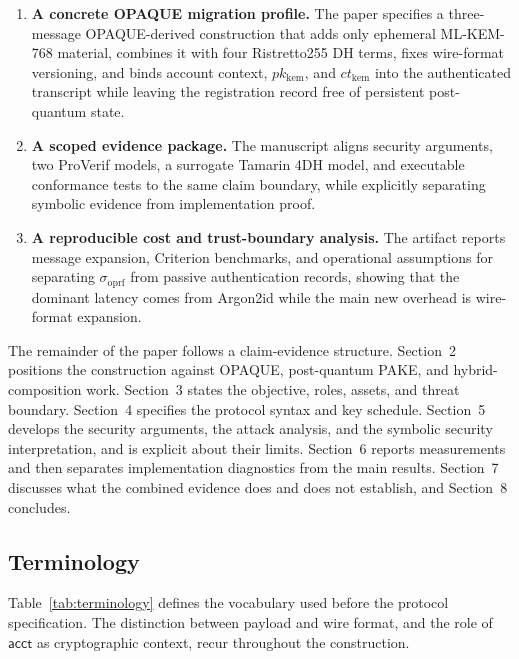 \documentclass[preprint,12pt]{elsarticle}
\newcommand{\acct}{\mathsf{acct}}
\newcommand{\sigoprf}{\sigma_{\mathrm{oprf}}}
\theoremstyle{remark}
\begin{document}
\begin{enumerate}
  \item \textbf{A concrete OPAQUE migration profile.} The paper specifies a
        three-message OPAQUE-derived construction that adds only ephemeral
        ML-KEM-768 material, combines it with four Ristretto255 DH terms,
        fixes wire-format versioning, and binds account context,
        $pk_{\mathrm{kem}}$, and $ct_{\mathrm{kem}}$ into the
        authenticated transcript while leaving the registration record free
        of persistent post-quantum state.
  \item \textbf{A scoped evidence package.} The manuscript aligns security
        arguments, two ProVerif models, a surrogate Tamarin 4DH model, and
        executable conformance tests to the same claim boundary, while
        explicitly separating symbolic evidence from implementation proof.
  \item \textbf{A reproducible cost and trust-boundary analysis.} The artifact
        reports message expansion, Criterion benchmarks, and operational
        assumptions for separating $\sigoprf$ from passive authentication
        records, showing that the dominant latency comes from Argon2id while
        the main new overhead is wire-format expansion.
\end{enumerate}

The remainder of the paper follows a claim-evidence structure.
Section~2 positions the construction against OPAQUE, post-quantum PAKE,
and hybrid-composition work. Section~3 states the objective, roles, assets,
and threat boundary. Section~4 specifies the protocol syntax and key
schedule. Section~5 develops the security arguments, the attack analysis, and the
symbolic security interpretation, and is explicit about their limits.
Section~6 reports measurements and then separates implementation
diagnostics from the main results. Section~7 discusses what the combined
evidence does and does not establish, and Section~8 concludes.

\subsection{Terminology}

Table~\ref{tab:terminology} defines the vocabulary used before the protocol
specification. The distinction between payload and wire format, and the role of
$\acct$ as cryptographic context, recur throughout the construction.
\end{document}
